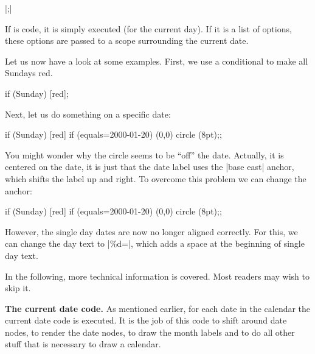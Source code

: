 \begin{command}{\calendar {}|;|}
\begin{enumerate}
    If  is code, it is simply executed (for the
    current day). If it is a list of options, these options are passed
    to a scope surrounding the current date.
  \end{enumerate}
  Let us now have a look at some examples. First, we use a conditional
  to make all Sundays red.
\begin{codeexample}[]
\tikz
  \calendar
    [dates=2000-01-01 to 2000-01-31,week list]
    if (Sunday) [red];
\end{codeexample}
  Next, let us do something on a specific date:
\begin{codeexample}[]
\tikz
  \calendar
    [dates=2000-01-01 to 2000-01-31,week list]
    if (Sunday)            [red]
    if (equals=2000-01-20) {\draw (0,0) circle (8pt);};
\end{codeexample}
  You might wonder why the circle seems to be ``off'' the
  date. Actually, it is centered on the date, it is just that the date
  label uses the |base east| anchor, which shifts the label up and
  right. To overcome this problem we can change the anchor:
\begin{codeexample}[]
\tikz [every day/.style={anchor=mid}]
  \calendar
    [dates=2000-01-01 to 2000-01-31,week list]
    if (Sunday)            [red]
    if (equals=2000-01-20) {\draw (0,0) circle (8pt);};
\end{codeexample}
  However, the single day dates are now no longer aligned
  correctly. For this, we can change the day text to |\%d=|,
  which adds a space at the beginning of single day
  text.
  
  In the following, more technical information is covered. Most
  readers may wish to skip it.

  \medskip
  \textbf{The current date code.}
  As mentioned earlier, for each date in the calendar the current date
  code is executed. It is the job of this code to shift around date
  nodes, to render the date nodes, to draw the month labels and to do
  all other stuff that is necessary to draw a calendar.


\end{command}
